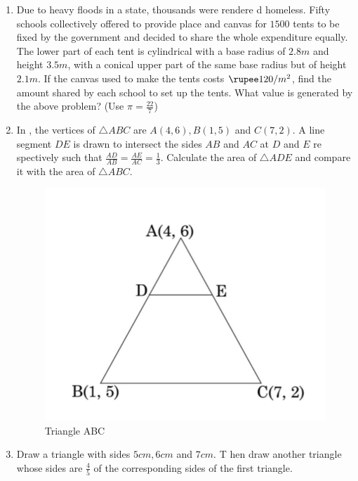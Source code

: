 \begin{enumerate}
    \item Due to heavy floods in a state, thousands were rendere
d homeless. Fifty schools collectively offered to provide place and canvas for $1500$ tents to be fixed by the government and decided to share the whole expenditure equally. The lower part of each tent is cylindrical with a base radius of $2.8 m$ and height $3.5 m$, with a conical upper part of the same base radius but of height $2.1 m$. If the canvas used to make the tents costs $\rupee 120/ m^2$, find the amount shared by each school to set up the tents. What value is generated by the above problem? (Use $\pi = \frac{22}{7} $)                                          
    \item In , the vertices of $\triangle ABC$ are $A(4, 6), B(1, 5)$ and $C(7, 2)$. A line segment $DE$ is drawn to intersect the sides $AB$ and $AC$ at $D$ and $E$ re
spectively such that $\frac{AD}{AB} = \frac{AE}{AC} = \frac{1}{3}$. Calculate the area of $\triangle ADE$ and compare it with the area of $\triangle ABC$.                                          \begin{figure}[H]                                                   \includegraphics[width=\columnwidth]{figs/triangleABC.jpg}         \caption{Triangle ABC}                                          \label{fig:triangleABC}                                     \end{figure}

\item Draw a triangle with sides $5 cm, 6 cm$ and $7 cm$. T
    hen draw another triangle whose sides are $\frac{4}{5}$ of the
    corresponding sides of the first triangle.
								\end{enumerate}                                                 

